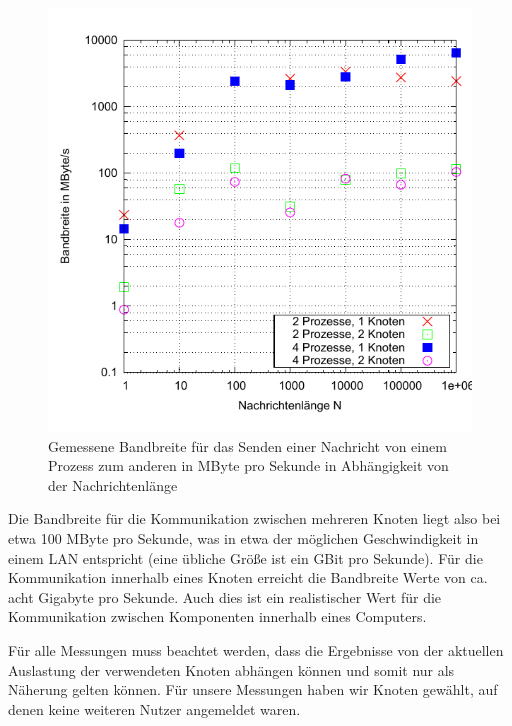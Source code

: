 \begin{figure}[htb]
  \centering
  \includegraphics[width=0.8\columnwidth,keepaspectratio]{../tmp/bandbreite}
  \caption{Gemessene Bandbreite für das Senden einer Nachricht von einem Prozess zum
  anderen in MByte pro Sekunde in Abhängigkeit von der Nachrichtenlänge}
  \label{fig:bandbreite}
\end{figure}

Die Bandbreite für die Kommunikation zwischen mehreren Knoten liegt also bei etwa 
100 MByte pro Sekunde, was in etwa der möglichen Geschwindigkeit in einem LAN entspricht (eine
übliche Größe ist  ein GBit pro Sekunde). Für die Kommunikation innerhalb eines Knoten 
erreicht die Bandbreite Werte von ca. acht Gigabyte pro Sekunde. Auch dies ist ein
realistischer Wert für die Kommunikation zwischen Komponenten innerhalb eines Computers.

Für alle Messungen muss beachtet werden, dass die Ergebnisse von der aktuellen Auslastung
der verwendeten Knoten abhängen können und somit nur als Näherung gelten können. Für 
unsere Messungen haben wir Knoten gewählt, auf denen keine weiteren Nutzer angemeldet waren.